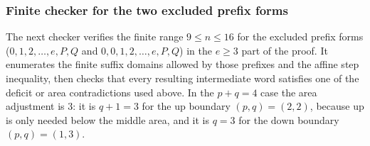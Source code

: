 \documentclass[11pt]{article}
\theoremstyle{plain}
\theoremstyle{definition}
\theoremstyle{remark}
\begin{document}
\subsubsection*{Finite checker for the two excluded prefix forms}
The next checker verifies the finite range \(9\le n\le 16\) for the excluded
prefix forms (\(0,1,2,\ldots,e,P,Q\) and
\(0,0,1,2,\ldots,e,P,Q\)) in the \(e\ge 3\) part of the proof.  It enumerates
the finite suffix domains allowed by those prefixes and the affine step
inequality, then checks that every resulting intermediate word satisfies one
of the deficit or area contradictions used above.  In the \(p+q=4\) case the
area adjustment is \(3\): it is \(q+1=3\) for the \(\mathrm{up}\) boundary
\((p,q)=(2,2)\), because \(\mathrm{up}\) is only needed below the middle area,
and it is \(q=3\) for the \(\mathrm{down}\) boundary \((p,q)=(1,3)\).
\end{document}
